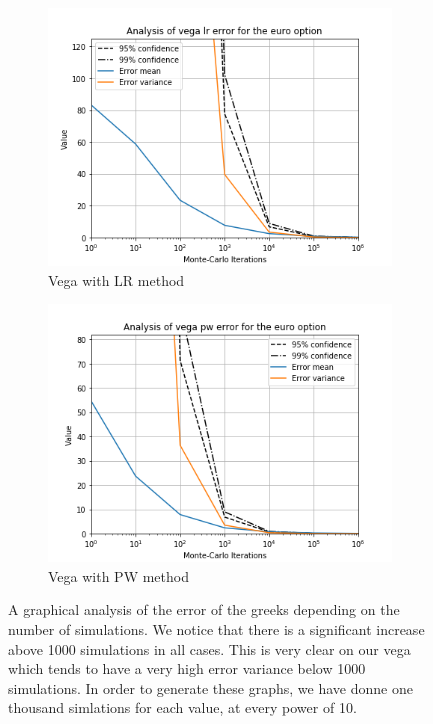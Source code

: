 \documentclass[11pt,a4paper,fleqn]{article}
\begin{document}
\begin{figure}
      \begin{subfigure}[b]{0.45\textwidth}
          \includegraphics[width=\textwidth]{graphs/eurovegalr.png}
          \caption{Vega with LR method}
      \end{subfigure}
      \begin{subfigure}[b]{0.45\textwidth}
          \includegraphics[width=\textwidth]{graphs/eurovegapw.png}
          \caption{Vega with PW method}
      \end{subfigure}

      \caption{\label{fig:eurographs}A graphical analysis of the error of the greeks depending on the number of simulations. We notice that there is a significant increase above 1000 simulations in all cases. This is very clear on our vega which tends to have a very high error variance below 1000 simulations. In order to generate these graphs, we have donne one thousand simlations for each value, at every power of 10.}
\end{figure}
\end{document}
